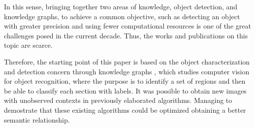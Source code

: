 In this sense, bringing together two areas of knowledge, object detection, and 
knowledge graphs, to achieve a common objective, such as detecting an object 
with greater precision and using fewer computational resources is one of the 
great challenges posed in the current decade. Thus, the works and 
publications on this topic are scarce.

Therefore, the starting point of this paper is based on the object 
characterization and detection concern through knowledge graphs \cite{Fang}, 
which studies computer vision for object recognition, where the purpose is 
to identify a set of regions and then be able to classify each section with 
labels. It was possible to obtain new images with unobserved contexts in 
previously elaborated algorithms. Managing to demostrate that these existing 
algorithms could be optimized obtaining a better semantic relationship.